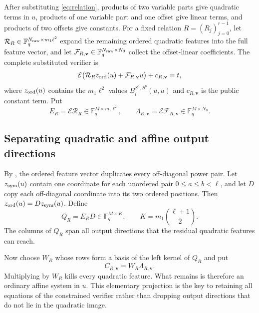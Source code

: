 \documentclass[11pt]{article}
\newcommand{\F}{\mathbb F}
\begin{document}
After substituting \eqref{eq:relation}, products of two variable parts give
quadratic terms in $u$, products of one variable part and one offset give
linear terms, and products of two offsets give constants.  For a fixed
relation $R=(R_j)_{j=0}^{r-1}$, let
$\mathcal R_R\in\F_q^{N_{\rm raw}\times m_1\ell^2}$ expand the remaining ordered
quadratic features into the full feature vector, and let
$\mathcal F_{R,\mathbf v}\in\F_q^{N_{\rm raw}\times N_0}$ collect the offset-linear
coefficients.  The complete substituted verifier is
\begin{equation}\label{eq:ordered-system}
 \mathcal E\bigl(\mathcal R_Rz_{\rm ord}(u)+\mathcal F_{R,\mathbf v}u\bigr)
 +c_{R,\mathbf v}=t,
\end{equation}
where $z_{\rm ord}(u)$ contains the $m_1\ell^2$ values
$B_i^{S^a,S^b}(u,u)$ and $c_{R,\mathbf v}$ is the public constant term.  Put
\begin{equation}\label{eq:ER}
 E_R=\mathcal E\mathcal R_R\in\F_q^{M\times m_1\ell^2},
 \qquad \Lambda_{R,\mathbf v}=\mathcal E\mathcal F_{R,\mathbf v}\in\F_q^{M\times N_0}.
\end{equation}

\subsection{Separating quadratic and affine output directions}

By , the ordered feature vector duplicates every
off-diagonal power pair.  Let $z_{\rm sym}(u)$ contain one coordinate for each
unordered pair $0\le a\le b<\ell$, and let $D$ copy each off-diagonal
coordinate into its two ordered positions.  Then
$z_{\rm ord}(u)=Dz_{\rm sym}(u)$.  Define
\begin{equation}\label{eq:QR}
 Q_R=E_RD\in\F_q^{M\times K},
 \qquad K=m_1\binom{\ell+1}{2}.
\end{equation}
The columns of $Q_R$ span all output directions that the residual quadratic
features can reach.

Now choose $W_R$ whose rows form a basis of the left kernel of $Q_R$ and put
\begin{equation}\label{eq:C}
 C_{R,\mathbf v}=W_R\Lambda_{R,\mathbf v}.
\end{equation}
Multiplying by $W_R$ kills every quadratic feature.  What remains is therefore
an ordinary affine system in $u$.  This elementary projection is the key to
retaining all equations of the constrained verifier rather than dropping
output directions that do not lie in the quadratic image.
\end{document}
